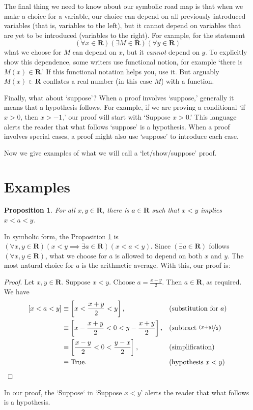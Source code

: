 \documentclass[12pt,fleqn,answers]{article}
\newcommand{\reals}{\mathbf{R}}
\newcommand{\true}{\mathrm{True}}
\newenvironment{myproof}
  {\begin{shaded}\begin{proof}}
  {\end{proof}\end{shaded}}
\newtheorem{prop}{Proposition}
\begin{document}
The final thing we need to know about our symbolic road map is that when we 
make a choice for a variable, our choice can depend on all previously
introduced variables (that is, variables to the left), but it cannot 
depend on variables that are yet to be introduced (variables to the right). 
For example, 
for the statement
\begin{equation*}
   \left(\forall x \in \reals\right)
   \left(\exists M \in \reals\right)
   \left(\forall y \in \reals \right)
 \end{equation*}
 what we choose for $M$ can depend on $x$, but it \emph{cannot}  depend on $y$. To explicitly show this dependence, some writers
 use functional notion, for example `there is $M(x) \in \reals$.'  If this functional notation helps you, use it. But arguably  
 $M(x) \in \reals$ conflates a real number (in this case $M$) with a function.

Finally, what about `suppose'?  When a proof involves `suppose,' generally it means that a hypothesis follows. For example, if
we are proving a conditional `if $x > 0$, then $x > -1$,' our proof will start with `Suppose $x > 0$.' This language alerts the
reader that what follows `suppose' is a hypothesis.  When a proof involves special cases, a proof might also use `suppose' to 
introduce each case.

Now we give examples of what we will call a `let/show/suppose' proof.

\section{Examples}

\begin{prop}
  For all $x,y \in \reals$, there is $a \in \reals$ such that
    $x < y$ implies $x<a<y$. \label{p1}   
\end{prop}
\noindent In symbolic form, the Proposition \ref{p1} is
$\left(\forall x,y \in \reals \right) 
\left(  x < y \implies \exists a \in \reals \right)
\left(x < a < y \right)$.  Since $\left(\exists a \in \reals \right)$ follows 
$\left(\forall x,y \in \reals \right)$, what we choose for $a$ is allowed to 
depend on both $x$ and $y$. The most natural choice for $a$ is the
arithmetic average.  With this, our proof is:
\begin{myproof}
    Let $x,y \in \reals$. Suppose $x < y$. Choose $a = \frac{x+y}{2}$.
    Then $a \in \reals$, as required. We have
    \begin{align*}
      \left[ x < a < y \right] 
          &\equiv \left[ x < \frac{x+y}{2} < y \right], &&\text{(substitution for $a$)} \\
          & \equiv \left[ x - \frac{x+y}{2} < 0 < y - \frac{x+y}{2}  \right], &&\text{(subtract $\nicefrac{(x+y)}{2}$)} \\
          & \equiv \left[ \frac{x-y}{2} < 0 < \frac{y-x}{2}  \right], &&\text{(simplification)} \\
          & \equiv \true. && \text{(hypothesis $x < y$)} \qedhere
    \end{align*} 
\end{myproof}
\noindent In our proof, the `Suppose` in  `Suppose $x < y$' alerts the reader that what follows is a hypothesis.
\end{document}
